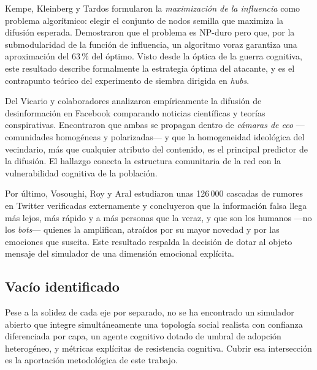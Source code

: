 \documentclass[12pt]{extarticle}
\numberwithin{equation}{section}
\begin{document}
Kempe, Kleinberg y Tardos \cite{KempeKleinbergTardos2003} formularon la \emph{maximizaci\'on de la influencia} como problema algor\'itmico: elegir el conjunto de nodos semilla que maximiza la difusi\'on esperada. Demostraron que el problema es NP-duro pero que, por la submodularidad de la funci\'on de influencia, un algoritmo voraz garantiza una aproximaci\'on del 63\,\% del \'optimo. Visto desde la \'optica de la guerra cognitiva, este resultado describe formalmente la estrategia \'optima del atacante, y es el contrapunto te\'orico del experimento de siembra dirigida en \emph{hubs}.

Del Vicario y colaboradores \cite{DelVicario2016} analizaron emp\'iricamente la difusi\'on de desinformaci\'on en Facebook comparando noticias cient\'ificas y teor\'ias conspirativas. Encontraron que ambas se propagan dentro de \emph{c\'amaras de eco} —comunidades homog\'eneas y polarizadas— y que la homogeneidad ideol\'ogica del vecindario, m\'as que cualquier atributo del contenido, es el principal predictor de la difusi\'on. El hallazgo conecta la estructura comunitaria de la red con la vulnerabilidad cognitiva de la poblaci\'on.

Por \'ultimo, Vosoughi, Roy y Aral \cite{Vosoughi2018} estudiaron unas 126\,000 cascadas de rumores en Twitter verificadas externamente y concluyeron que la informaci\'on falsa llega m\'as lejos, m\'as r\'apido y a m\'as personas que la veraz, y que son los humanos —no los \emph{bots}— quienes la amplifican, atra\'idos por su mayor novedad y por las emociones que suscita. Este resultado respalda la decisi\'on de dotar al objeto mensaje del simulador de una dimensi\'on emocional expl\'icita.

\subsection{Vac\'io identificado}

Pese a la solidez de cada eje por separado, no se ha encontrado un simulador abierto que integre simult\'aneamente una topolog\'ia social realista con confianza diferenciada por capa, un agente cognitivo dotado de umbral de adopci\'on heterog\'eneo, y m\'etricas expl\'icitas de resistencia cognitiva. Cubrir esa intersecci\'on es la aportaci\'on metodol\'ogica de este trabajo.

\newpage


\end{document}
